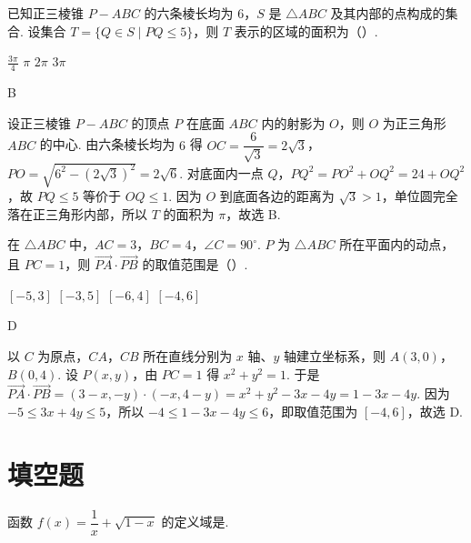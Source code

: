 \begin{problem}
已知正三棱锥 \(P-ABC\) 的六条棱长均为 6，\(S\) 是 \(\triangle ABC\) 及其内部的点构成的集合. 设集合 \(T=\{Q\in S\mid PQ\le 5\}\)，则 \(T\) 表示的区域的面积为（\quad）.

\choices
    {\(\frac{3\pi}{4}\)}
    {\(\pi\)}
    {\(2\pi\)}
    {\(3\pi\)}
\end{problem}

\begin{answer}
B
\end{answer}

\begin{solution}
设正三棱锥 \(P-ABC\) 的顶点 \(P\) 在底面 \(ABC\) 内的射影为 \(O\)，则 \(O\) 为正三角形 \(ABC\) 的中心. 由六条棱长均为 \(6\) 得 \(OC=\dfrac{6}{\sqrt3}=2\sqrt3\)，\(PO=\sqrt{6^2-(2\sqrt3)^2}=2\sqrt6\). 对底面内一点 \(Q\)，\(PQ^2=PO^2+OQ^2=24+OQ^2\)，故 \(PQ\le5\) 等价于 \(OQ\le1\). 因为 \(O\) 到底面各边的距离为 \(\sqrt3>1\)，单位圆完全落在正三角形内部，所以 \(T\) 的面积为 \(\pi\)，故选 B.
\end{solution}

\begin{problem}
在 \(\triangle ABC\) 中，\(AC=3\)，\(BC=4\)，\(\angle C=90^\circ\). \(P\) 为 \(\triangle ABC\) 所在平面内的动点，且 \(PC=1\)，则 \(\overrightarrow{PA}\cdot \overrightarrow{PB}\) 的取值范围是（\quad）.

\choices
    {\([-5,3]\)}
    {\([-3,5]\)}
    {\([-6,4]\)}
    {\([-4,6]\)}
\end{problem}

\begin{answer}
D
\end{answer}

\begin{solution}
以 \(C\) 为原点，\(CA\)，\(CB\) 所在直线分别为 \(x\) 轴、\(y\) 轴建立坐标系，则 \(A(3,0)\)，\(B(0,4)\). 设 \(P(x,y)\)，由 \(PC=1\) 得 \(x^2+y^2=1\). 于是 \(\overrightarrow{PA}\cdot\overrightarrow{PB}=(3-x,-y)\cdot(-x,4-y)=x^2+y^2-3x-4y=1-3x-4y\). 因为 \(-5\le3x+4y\le5\)，所以 \(-4\le1-3x-4y\le6\)，即取值范围为 \([-4,6]\)，故选 D.
\end{solution}

\section{填空题}

\begin{problem}
函数 \(f(x)=\dfrac{1}{x}+\sqrt{1-x}\) 的定义域是\fillinblank{}.
\end{problem}

